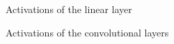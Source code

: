 \documentclass[a4paper,12pt,sort&compress]{article}
\begin{document}
\begin{figure}
    \centering
    \caption{Activations of the linear layer}
    \label{fig:activations}
\end{figure}

\begin{figure}
    \centering
    \caption{Activations of the convolutional layers}
    \label{fig:conv_activations}
\end{figure}
\end{document}
